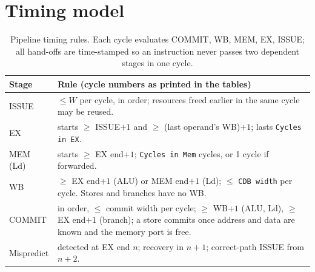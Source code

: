 \documentclass[11pt]{article}
\begin{document}
\section{Timing model}
\begin{table}[H]\centering\small
\begin{tabular}{@{}l p{}@{}}\toprule
Stage & Rule (cycle numbers as printed in the tables) \\\midrule
ISSUE & $\le W$ per cycle, in order; resources freed earlier in the same cycle may be reused. \\
EX & starts $\ge$ ISSUE$+1$ and $\ge$ (last operand's WB)$+1$; lasts \texttt{Cycles in EX}. \\
MEM (Ld) & starts $\ge$ EX end$+1$; \texttt{Cycles in Mem} cycles, or 1 cycle if forwarded. \\
WB & $\ge$ EX end$+1$ (ALU) or MEM end$+1$ (Ld); $\le$ \texttt{CDB width} per cycle. Stores and branches have no WB. \\
COMMIT & in order, $\le$ commit width per cycle; $\ge$ WB$+1$ (ALU, Ld), $\ge$ EX end$+1$
  (branch); a store commits once address and data are known and the memory port is free. \\
Mispredict & detected at EX end $n$; recovery in $n{+}1$; correct-path ISSUE from $n{+}2$. \\
\bottomrule\end{tabular}
\caption{Pipeline timing rules. Each cycle evaluates COMMIT, WB, MEM, EX, ISSUE; all hand-offs are
time-stamped so an instruction never passes two dependent stages in one cycle.}
\end{table}
\end{document}

